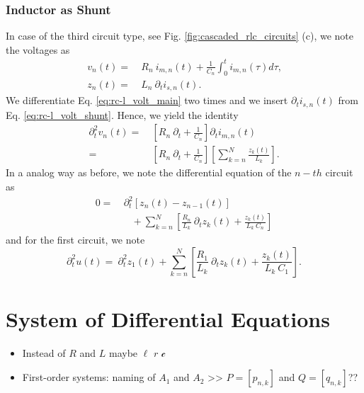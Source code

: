 \documentclass[a4paper, 10pt, twoside, twocolumn]{scrartcl}
\begin{document}
\subsubsection*{Inductor as Shunt}
In case of the third circuit type, see Fig. \ref{fig:cascaded_rlc_circuits} (c), we note the voltages as 
\begin{align}
	v_{n}(t) =&~ R_n ~ i_{m,n}(t) + \frac{1}{C_{n}} \int_{0}^{t} i_{m,n}(\tau) d\tau \text{,} \label{eq:rc-l_volt_main}  \\ 
	z_{n}(t) =&~ L_n ~ \partial_{t} i_{s,n}(t) \text{.} \label{eq:rc-l_volt_shunt}
\end{align}
We differentiate Eq. \eqref{eq:rc-l_volt_main} two times and we insert $\partial_{t} i_{s,n}(t)$ from Eq. \eqref{eq:rc-l_volt_shunt}. Hence, we yield the identity
\begin{align*}
	\partial_{t}^2 v_{n}(t) =&~ \left[R_n ~ \partial_{t} + \frac{1}{C_{n}} \right] \partial_{t}  i_{m,n}(t) \\
	=&~ \left[R_n ~ \partial_{t} + \frac{1}{C_{n}} \right]  \left[ \sum_{k=n}^{N} \frac{z_{k}(t)}{L_{k}}  \right] \text{.}
\end{align*}
In a analog way as before, we note the differential equation of the $n-th$ circuit as
\begin{align}
	0 =&~  \partial_{t}^2 \left[z_{n}(t) - z_{n-1}(t)\right] \nonumber \\
	&\quad + \sum_{k=n}^{N} \left[ \frac{R_{n}}{L_{k}}~\partial_{t} z_{k}(t) + \frac{z_{k}(t)}{L_{k}~C_{n}} \right] \label{eq:rc-l_shunt_ode_n}
\end{align}
and for the first circuit, we note
\begin{equation}
	\partial_{t}^2 u(t) =~  \partial_{t}^2 z_{1}(t) + \sum_{k=n}^{N} \left[ \frac{R_{1}}{L_{k}}~\partial_{t} z_{k}(t) + \frac{z_{k}(t)}{L_{k}~C_{1}} \right] \text{.} \label{eq:rc-l_shunt_ode_0}
\end{equation}







\section{System of Differential Equations}

\begin{itemize}
	\item Instead of $R$ and $L$ maybe $\ell$ $r$ $\mathcal{c}$
	\item First-order systems: naming of $A_{1}$ and $A_{2}$ >> $P=[p_{n,k}]$ and $Q=[q_{n,k}]$??
\end{itemize}
\end{document}
